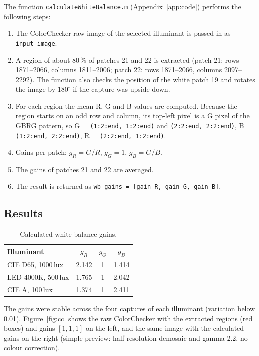 \documentclass[11pt,a4paper]{article}
\begin{document}
The function \texttt{calculateWhiteBalance.m} (Appendix~\ref{app:code})
performs the following steps:
\begin{enumerate}
  \item The ColorChecker raw image of the selected illuminant is passed in as
        \texttt{input\_image}.
  \item A region of about 80\,\% of patches 21 and 22 is extracted
        (patch 21: rows 1871--2066, columns 1811--2006;
        patch 22: rows 1871--2066, columns 2097--2292).
        The function also checks the position of the white patch 19 and
        rotates the image by $180^\circ$ if the capture was upside down.
  \item For each region the mean R, G and B values are computed. Because the
        region starts on an odd row and column, its top-left pixel is a G pixel
        of the GBRG pattern, so
        G = \texttt{(1:2:end, 1:2:end)} and \texttt{(2:2:end, 2:2:end)},
        B = \texttt{(1:2:end, 2:2:end)},
        R = \texttt{(2:2:end, 1:2:end)}.
  \item Gains per patch:
        $g_R = \bar{G}/\bar{R}$, $g_G = 1$, $g_B = \bar{G}/\bar{B}$.
  \item The gains of patches 21 and 22 are averaged.
  \item The result is returned as \texttt{wb\_gains = [gain\_R, gain\_G, gain\_B]}.
\end{enumerate}

\subsection{Results}

\begin{table}[H]
  \centering
  \caption{Calculated white balance gains.}
  \begin{tabular}{lccc}
    \toprule
    Illuminant & $g_R$ & $g_G$ & $g_B$ \\
    \midrule
    CIE D65, 1000\,lux  & 2.142 & 1 & 1.414 \\
    LED 4000K, 500\,lux & 1.765 & 1 & 2.042 \\
    CIE A, 100\,lux     & 1.374 & 1 & 2.411 \\
    \bottomrule
  \end{tabular}
\end{table}

The gains were stable across the four captures of each illuminant (variation
below 0.01). Figure~\ref{fig:cc} shows the raw ColorChecker with the extracted
regions (red boxes) and gains $[1, 1, 1]$ on the left, and the same image with
the calculated gains on the right (simple preview: half-resolution demosaic and
gamma 2.2, no colour correction).
\end{document}
